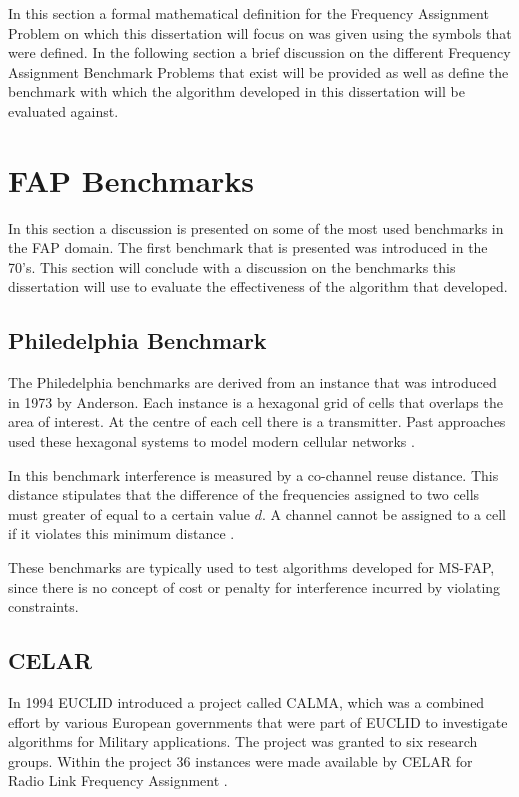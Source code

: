 In this section a formal mathematical definition for the Frequency Assignment Problem on which this dissertation will focus on was given using the symbols that were defined. In the following section a brief discussion on the different Frequency Assignment Benchmark Problems that exist will be provided as well as define the benchmark with which the algorithm developed in this dissertation will be evaluated against.
\section{FAP Benchmarks}
\label{sec:FAPBenchmarks}
In this section a discussion is presented on some of the most used benchmarks in the FAP domain. The first benchmark that is presented was introduced in the 70's. This section will conclude with a discussion on the benchmarks this dissertation will use to evaluate the effectiveness of the algorithm that developed.
\subsection{Philedelphia Benchmark}
The Philedelphia benchmarks are derived from an instance that was introduced in 1973 by Anderson. Each instance is a hexagonal grid of cells that overlaps the area of interest. At the centre of each cell there is a transmitter. Past approaches used these hexagonal systems to model modern cellular networks \cite{Karen2004,ExactMIFAP}.

In this benchmark interference is measured by a co-channel reuse distance. This distance stipulates that the difference of the frequencies  assigned to two cells must greater of equal to a certain value $d$. A channel cannot be assigned to a cell if it violates this minimum distance \cite{Karen2004,ExactMIFAP}.

These benchmarks are typically used to test algorithms developed for MS-FAP, since there is no concept of cost or penalty for interference incurred by violating constraints.
\subsection{CELAR}
In 1994 EUCLID introduced a project called CALMA, which was a combined effort by various European governments that were part of EUCLID to investigate algorithms for Military applications. The project was granted to six research groups. Within the project 36 instances were made available by CELAR for Radio Link Frequency Assignment \cite{Karen2004,DynamicFAP}.

